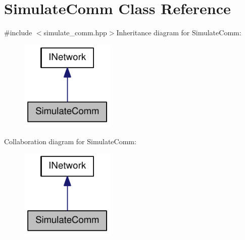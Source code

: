 \hypertarget{class_simulate_comm}{
\section{SimulateComm Class Reference}
\label{class_simulate_comm}
}


{\ttfamily \#include $<$simulate\_\-comm.hpp$>$}Inheritance diagram for SimulateComm:\nopagebreak
\begin{figure}[H]
\begin{center}
\leavevmode
\includegraphics[width=128pt]{class_simulate_comm__inherit__graph}
\end{center}
\end{figure}
Collaboration diagram for SimulateComm:\nopagebreak
\begin{figure}[H]
\begin{center}
\leavevmode
\includegraphics[width=128pt]{class_simulate_comm__coll__graph}
\end{center}
\end{figure}
